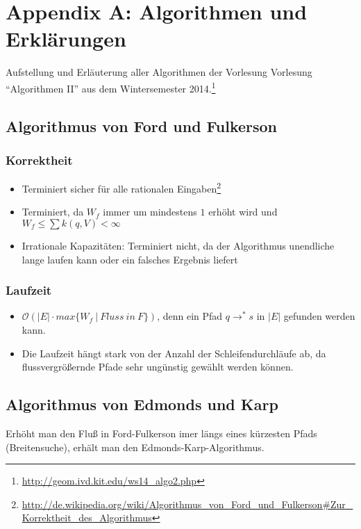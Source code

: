 \section{Appendix A: Algorithmen und Erklärungen}

Aufstellung und Erläuterung aller Algorithmen der Vorlesung Vorlesung "`Algorithmen II"' aus dem Wintersemester 2014.\footnote{\url{http://geom.ivd.kit.edu/ws14_algo2.php}}

\subsection{Algorithmus von Ford und Fulkerson}


\subsubsection{Korrektheit}
\begin{itemize}
	\item Terminiert sicher für alle rationalen Eingaben\footnote{\url{http://de.wikipedia.org/wiki/Algorithmus_von_Ford_und_Fulkerson\#Zur_Korrektheit_des_Algorithmus}}
	\item Terminiert, da \(W_f\) immer um mindestens \(1\) erhöht wird und \(W_f \leq \sum k(q,V) < \infty\)
	\item Irrationale Kapazitäten: Terminiert nicht, da der Algorithmus unendliche lange laufen kann oder ein falsches Ergebnis liefert
\end{itemize}

\subsubsection{Laufzeit}
\begin{itemize}
	\item \(\mathcal{O}(|E| \cdot max\{W_f~|~Fluss~in~F\})\), denn ein Pfad \(q \rightarrow^* s\) in \(|E|\) gefunden werden kann.
	\item Die Laufzeit hängt stark von der Anzahl der Schleifendurchläufe ab, da flussvergrößernde Pfade sehr ungünstig gewählt werden können.
\end{itemize}


\subsection{Algorithmus von Edmonds und Karp}
Erhöht man den Fluß in Ford-Fulkerson imer längs eines kürzesten Pfads (Breitensuche), erhält man den Edmonds-Karp-Algorithmus.

